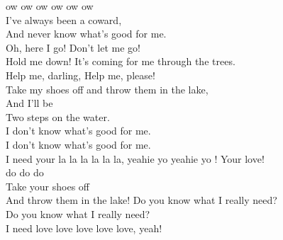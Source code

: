   ow ow ow ow ow ow\\
  I've always been a coward,\\
  And never know what's good for me.\\
  Oh, here I go!
  Don't let me go!\\
  Hold me down!
  It's coming for me through the trees.\\
  Help me, darling,
  Help me, please!\\
  Take my shoes off
  and throw them in the lake,\\
  And I'll be\\
  Two steps on the water. \\
  I don't know what's good for me.\\
  I don't know what's good for me.\\
  I need your la la la la la la, yeahie yo yeahie yo !
  Your love!\\
  do do do\\
  Take your shoes off\\
  And throw them in the lake!
  Do you know what I really need?\\
  Do you know what I really need?\\
  I need love love love love love, yeah!\\
